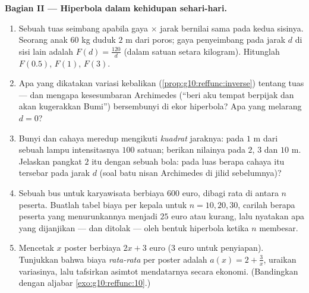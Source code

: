 \begin{problem}
\medskip
\noindent\textbf{Bagian II --- Hiperbola dalam kehidupan sehari-hari.}
\begin{enumerate}[resume]
  \item Sebuah tuas seimbang apabila gaya $\times$ jarak bernilai
        sama pada kedua sisinya. Seorang anak $60$ kg duduk $2$ m dari
        poros; gaya penyeimbang pada jarak $d$ di sisi lain
        adalah $F(d) = \frac{120}{d}$ (dalam satuan setara kilogram).
        Hitunglah $F(0.5)$, $F(1)$, $F(3)$.
  \item Apa yang dikatakan variasi  kebalikan
        (\cref{prop:g10:reffunc:inverse}) tentang tuas ---
        dan mengapa kesesumbaran Archimedes (``beri aku tempat
        berpijak dan akan kugerakkan Bumi'') bersembunyi di
        ekor hiperbola? Apa yang melarang $d = 0$?
  \item Bunyi dan cahaya meredup mengikuti \emph{kuadrat}
        jaraknya: pada $1$ m dari sebuah lampu intensitasnya $100$
        satuan; berikan nilainya pada $2$, $3$ dan $10$ m. Jelaskan
        pangkat $2$ itu dengan sebuah bola: pada luas berapa cahaya
        itu tersebar pada jarak $d$ (soal batu nisan Archimedes di jilid sebelumnya)?
  \item Sebuah bus untuk karyawisata berbiaya $600$ euro, dibagi
        rata di antara $n$ peserta. Buatlah tabel biaya per
        kepala untuk $n = 10, 20, 30$, carilah berapa peserta yang
        menurunkannya menjadi $25$ euro atau kurang, lalu nyatakan apa yang
        dijanjikan --- dan ditolak --- oleh bentuk hiperbola ketika $n$
        membesar.
  \item Mencetak $x$ poster berbiaya $2x + 3$ euro ($3$ euro untuk
        penyiapan). Tunjukkan bahwa biaya \emph{rata-rata} per poster adalah
        $a(x) = 2 + \frac3x$, uraikan variasinya, lalu
        tafsirkan asimtot mendatarnya secara ekonomi.
        (Bandingkan dengan aljabar \cref{exo:g10:reffunc:10}.)
\end{enumerate}


\end{problem}
